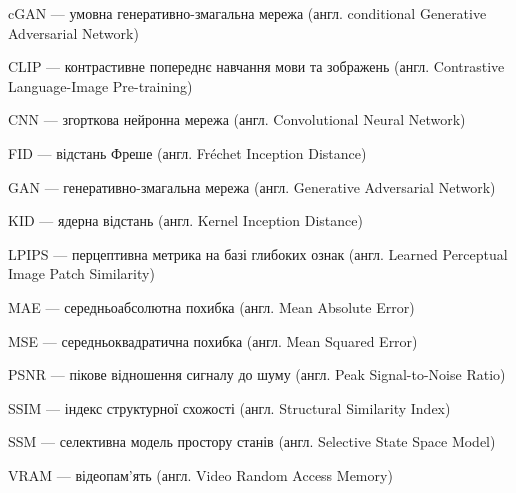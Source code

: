 \shortings


    cGAN --- умовна генеративно-змагальна мережа (англ. conditional Generative Adversarial Network)

    CLIP --- контрастивне попереднє навчання мови та зображень (англ. Contrastive Language-Image Pre-training)

    CNN --- згорткова нейронна мережа (англ. Convolutional Neural Network)

    FID --- відстань Фреше (англ. Fréchet Inception Distance)

    GAN --- генеративно-змагальна мережа (англ. Generative Adversarial Network)

    KID --- ядерна відстань (англ. Kernel Inception Distance)

    LPIPS --- перцептивна метрика на базі глибоких ознак (англ. Learned Perceptual Image Patch Similarity)

    MAE --- середньоабсолютна похибка (англ. Mean Absolute Error)

    MSE --- середньоквадратична похибка (англ. Mean Squared Error)

    PSNR --- пікове відношення сигналу до шуму (англ. Peak Signal-to-Noise Ratio)

    SSIM --- індекс структурної схожості (англ. Structural Similarity Index)

    SSM --- селективна модель простору станів (англ. Selective State Space Model)

    VRAM --- відеопам'ять (англ. Video Random Access Memory)